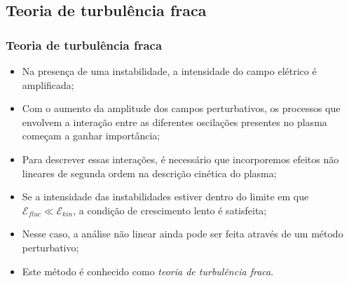 \documentclass[10pt,aspectratio=1610,lualatex]{beamer}
\begin{document}
\subsection{Teoria de turbulência fraca}
\begin{frame}
  \frametitle{Teoria de turbulência fraca}
  \begin{itemize}
    \item Na presença de uma instabilidade, a intensidade do
    campo elétrico é amplificada;
    \vspace{0.3cm}
    \pause
    \item Com o aumento da amplitude dos campos perturbativos,
    os processos que envolvem a interação entre as diferentes
    oscilações presentes no plasma começam a ganhar importância;
    \vspace{0.3cm}
    \pause
    \item Para descrever essas interações, é necessário que
    incorporemos efeitos não lineares de segunda ordem na
    descrição cinética do plasma;
    \vspace{0.3cm}
    \pause
    \item Se a intensidade das instabilidades estiver dentro do
    limite em que $\mathcal{E}_{fluc} \ll \mathcal{E}_{kin}$, a
    condição de crescimento lento é satisfeita;
    \vspace{0.3cm}
    \pause
    \item Nesse caso, a análise não linear ainda pode ser feita
    através de um método perturbativo;
    \vspace{0.3cm}
    \pause
    \item Este método é conhecido como \emph{teoria de turbulência
      fraca}.
  \end{itemize}
\end{frame}
\end{document}
